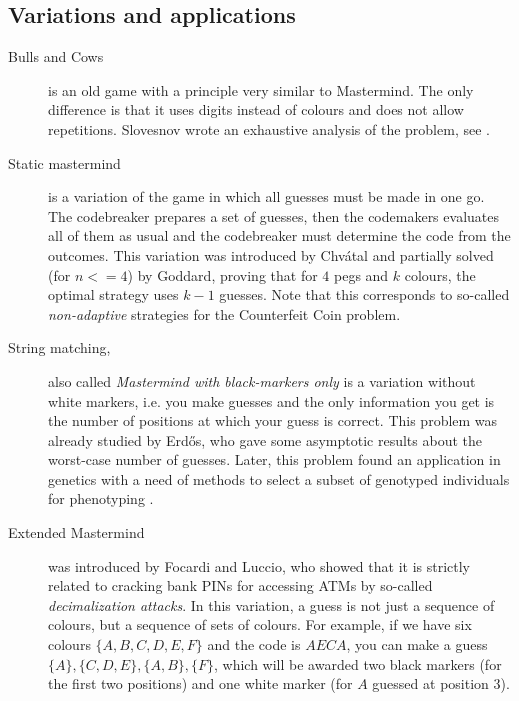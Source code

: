 \subsection{Variations and applications}

\begin{description}
\item[Bulls and Cows]
is an old game with a principle very similar to Mastermind.
The only difference is that it uses digits instead of colours and does not allow repetitions.
Slovesnov wrote an exhaustive analysis of the problem, see \cite{bullsandcows}.


\item[Static mastermind] is a variation of the game in which all guesses
  must be made in one go.
The codebreaker prepares a set of guesses,
  then the codemakers evaluates all of them as usual and
  the codebreaker must determine the code from the outcomes.
This variation was introduced by Chvátal\cite{mm-chvatal} and
  partially solved (for $n<=4$) by Goddard\cite{mm-static},
  proving that for $4$ pegs and $k$ colours,
  the optimal strategy uses $k-1$ guesses.
Note that this corresponds to so-called \emph{non-adaptive} strategies
  for the Counterfeit Coin problem.

\item[String matching,] also called
  \emph{Mastermind with black-markers only}
  is a variation without white markers, i.e.
  you make guesses and the only information you get is the
  number of positions at which your guess is correct.
This problem was already studied by Erdős\cite{erdos-two}, who gave some
  asymptotic results about the worst-case number of guesses.
Later, this problem found an application in genetics with a need of
  methods to select a subset of genotyped individuals for phenotyping
  \cite{mm-app-gen2}\cite{mm-app-gen}.

\item[Extended Mastermind] was introduced by Focardi and Luccio,
  who showed that it is strictly related to cracking bank PINs for accessing ATMs
  by so-called \emph{decimalization attacks}\cite{mm-pins}.
In this variation, a guess is not just a sequence of colours, but a sequence of
  sets of colours. For example, if we have six colours $\{A, B, C, D, E, F\}$
  and the code is $AECA$,
  you can make a guess $\{A\}, \{C,D,E\}, \{A,B\}, \{F\}$, which
  will be awarded two black markers (for the first two positions)
  and one white marker (for $A$ guessed at position 3).
\end{description}

